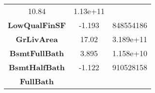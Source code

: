 \documentclass[]{article}
\begin{document}
\begin{longtable}[c]{@{}ccc@{}}
\begin{minipage}[t]{0.16\columnwidth}
10.84
\strut\end{minipage} &
\begin{minipage}[t]{0.19\columnwidth}\centering\strut
1.13e+11
\strut\end{minipage}\tabularnewline
\begin{minipage}[t]{0.25\columnwidth}\centering\strut
\textbf{LowQualFinSF}
\strut\end{minipage} &
\begin{minipage}[t]{0.16\columnwidth}\centering\strut
-1.193
\strut\end{minipage} &
\begin{minipage}[t]{0.19\columnwidth}\centering\strut
848554186
\strut\end{minipage}\tabularnewline
\begin{minipage}[t]{0.25\columnwidth}\centering\strut
\textbf{GrLivArea}
\strut\end{minipage} &
\begin{minipage}[t]{0.16\columnwidth}\centering\strut
17.02
\strut\end{minipage} &
\begin{minipage}[t]{0.19\columnwidth}\centering\strut
3.189e+11
\strut\end{minipage}\tabularnewline
\begin{minipage}[t]{0.25\columnwidth}\centering\strut
\textbf{BsmtFullBath}
\strut\end{minipage} &
\begin{minipage}[t]{0.16\columnwidth}\centering\strut
3.895
\strut\end{minipage} &
\begin{minipage}[t]{0.19\columnwidth}\centering\strut
1.158e+10
\strut\end{minipage}\tabularnewline
\begin{minipage}[t]{0.25\columnwidth}\centering\strut
\textbf{BsmtHalfBath}
\strut\end{minipage} &
\begin{minipage}[t]{0.16\columnwidth}\centering\strut
-1.122
\strut\end{minipage} &
\begin{minipage}[t]{0.19\columnwidth}\centering\strut
910528158
\strut\end{minipage}\tabularnewline
\begin{minipage}[t]{0.25\columnwidth}\centering\strut
\textbf{FullBath}
\strut\end{minipage} &
\begin{minipage}[t]{0.16\columnwidth}\centering\strut

\end{minipage}
\end{longtable}
\end{document}
